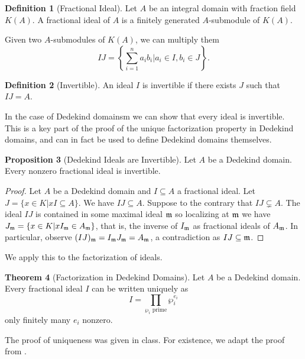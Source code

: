 \documentclass{amsart}
\theoremstyle{definition}
\newtheorem{theorem}{Theorem}[section]
\newtheorem{proposition}[theorem]{Proposition}
\newtheorem{definition}[theorem]{Definition}
\numberwithin{equation}{section}
\begin{document}
\begin{definition}[Fractional Ideal]
  Let $A$ be an integral domain with fraction field $K(A)$. A fractional ideal of $A$ is a finitely generated $A$-submodule of $K(A)$. 
\end{definition}
Given two $A$-submodules of $K(A)$, we can multiply them 
$$IJ=\left\{\sum_{i=1}^{n}a_{i}b_{i}|a_{i}\in I,b_{i}\in J\right\}.$$
\begin{definition}[Invertible]
  An ideal $I$ is invertible if there exists $J$ such that $IJ=A$. 
\end{definition}
In the case of Dedekind domainsm we can show that every ideal is invertible. This is a key part of the proof of the unique factorization property in Dedekind domains, and can in fact be used to define Dedekind domains themselves. 
\begin{proposition}[Dedekind Ideals are Invertible]
  Let $A$ be a Dedekind domain. Every nonzero fractional ideal is invertible. 
\end{proposition}
\begin{proof}
  Let $A$ be a Dedekind domain and $I\subseteq A$ a fractional ideal. Let $J=\{x\in K|xI\subseteq A\}$. We have $IJ\subseteq A$. Suppose to the contrary that $IJ\subsetneq A$. The ideal $IJ$ is contained in some maximal ideal $\mathfrak{m}$ so localizing at $\mathfrak{m}$ we have $J_{\mathfrak{m}}=\{x\in K|x I_{\mathfrak{m}}\in A_{\mathfrak{m}}\}$, that is, the inverse of $I_{\mathfrak{m}}$ as fractional ideals of $A_{\mathfrak{m}}$. In particular, observe $(IJ)_{\mathfrak{m}}=I_{\mathfrak{m}}J_{\mathfrak{m}}=A_{\mathfrak{m}}$, a contradiction as $IJ\subseteq\mathfrak{m}$. 
\end{proof}
We apply this to the factorization of ideals. 
\begin{theorem}[Factorization in Dedekind Domains]
  Let $A$ be a Dedekind domain. Every fractional ideal $I$ can be written uniquely as 
  $$I=\prod_{\wp_{i}\text{ prime}}\wp_{i}^{e_{i}}$$
  only finitely many $e_{i}$ nonzero. 
\end{theorem}
The proof of uniqueness was given in class. For existence, we adapt the proof from \cite[\S 3, Thm. 14]{Marcus}.
\end{document}
